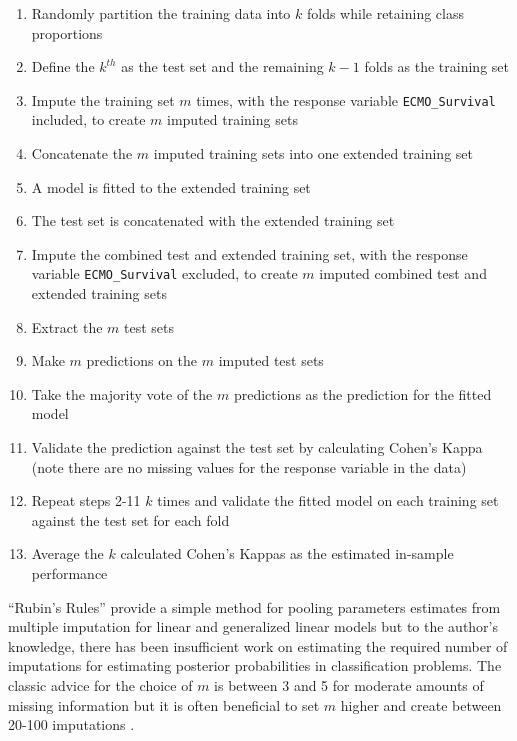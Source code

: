\documentclass[12pt,]{article}
\providecommand{\tightlist}{%
  \setlength{\itemsep}{0pt}\setlength{\parskip}{0pt}}
\begin{document}
\begin{enumerate}
\def\labelenumi{\arabic{enumi}.}
\tightlist
\item
  Randomly partition the training data into \(k\) folds while retaining
  class proportions
\item
  Define the \(k^{th}\) as the test set and the remaining \(k-1\) folds
  as the training set
\item
  Impute the training set \(m\) times, with the response variable
  \texttt{ECMO\_Survival} included, to create \(m\) imputed training
  sets
\item
  Concatenate the \(m\) imputed training sets into one extended training
  set
\item
  A model is fitted to the extended training set
\item
  The test set is concatenated with the extended training set
\item
  Impute the combined test and extended training set, with the response
  variable \texttt{ECMO\_Survival} excluded, to create \(m\) imputed
  combined test and extended training sets
\item
  Extract the \(m\) test sets
\item
  Make \(m\) predictions on the \(m\) imputed test sets
\item
  Take the majority vote of the \(m\) predictions as the prediction for
  the fitted model
\item
  Validate the prediction against the test set by calculating Cohen's
  Kappa (note there are no missing values for the response variable in
  the data)
\item
  Repeat steps 2-11 \(k\) times and validate the fitted model on each
  training set against the test set for each fold
\item
  Average the \(k\) calculated Cohen's Kappas as the estimated in-sample
  performance
\end{enumerate}

``Rubin's Rules'' \autocite{rubin_inference_1976} provide a simple
method for pooling parameters estimates from multiple imputation for
linear and generalized linear models but to the author's knowledge,
there has been insufficient work on estimating the required number of
imputations for estimating posterior probabilities in classification
problems. The classic advice for the choice of \(m\) is between 3 and 5
for moderate amounts of missing information but it is often beneficial
to set \(m\) higher and create between 20-100 imputations
\autocite{van_buuren_flexible_2012}.
\end{document}
